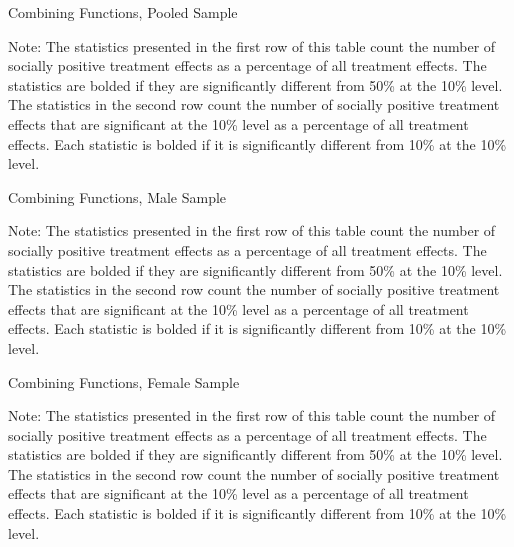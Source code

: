 	\begin{table}[H]
	\begin{threeparttable}
     \caption{Combining Functions, Pooled Sample} 
     \label{table:abccare_rslt_pooled_counts_all}
	
	\begin{tablenotes}
	\footnotesize
	 Note: The statistics presented in the first row of this table count the number of socially positive 
	treatment effects as a percentage of all treatment effects. The statistics are bolded if they are 
	significantly different from 50\% at the 10\% level. The statistics in the second row count the
	number of socially positive treatment effects that are significant at the 10\% level as a percentage
	of all treatment effects. Each statistic is bolded if it is significantly different from 10\% at the 10\% 
	level.
	\end{tablenotes}
	\end{threeparttable}
	\end{table}  

	\begin{table}[H]
	\begin{threeparttable}
     \caption{Combining Functions, Male Sample} 
     \label{table:abccare_rslt_male_counts_all}
	
	\begin{tablenotes}
	\footnotesize
	 Note: The statistics presented in the first row of this table count the number of socially positive 
	treatment effects as a percentage of all treatment effects. The statistics are bolded if they are 
	significantly different from 50\% at the 10\% level. The statistics in the second row count the
	number of socially positive treatment effects that are significant at the 10\% level as a percentage
	of all treatment effects. Each statistic is bolded if it is significantly different from 10\% at the 10\% 
	level.
	\end{tablenotes}
	\end{threeparttable}
	\end{table}  

	\begin{table}[H]
	\begin{threeparttable}
     \caption{Combining Functions, Female Sample} 
     \label{table:abccare_rslt_female_counts_all}
	
	\begin{tablenotes}
	\footnotesize
	 Note: The statistics presented in the first row of this table count the number of socially positive 
	treatment effects as a percentage of all treatment effects. The statistics are bolded if they are 
	significantly different from 50\% at the 10\% level. The statistics in the second row count the
	number of socially positive treatment effects that are significant at the 10\% level as a percentage
	of all treatment effects. Each statistic is bolded if it is significantly different from 10\% at the 10\% 
	level.
	\end{tablenotes}
	\end{threeparttable}
	\end{table}  

